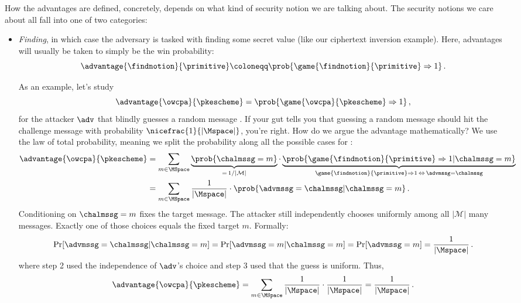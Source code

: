         How the advantages are defined, concretely, depends on what kind of security
          notion we are talking about.
          The security notions we care about all fall into one of two categories:
        
        \begin{itemize}
        	\item \emph{Finding},
        		in which case the adversary is tasked with finding some secret value
        		(like our ciphertext inversion example). Here, 
        		advantages will usually be taken to simply be the win probability:
        		\[
	        		\advantage{\findnotion}{\primitive} \coloneqq
	        		\prob{\game{\findnotion}{\primitive} \Rightarrow 1}\, .
        		\]
        		
        		As an example, let's study
        		\[
	        		\advantage{\owcpa}{\pkescheme} = \prob{\game{\owcpa}{\pkescheme} \Rightarrow 1} \, ,
        		\]
        		for the attacker $\adv$ that blindly guesses a random message \advmssg.
        		If your gut tells you that guessing a random message \advmssg should hit the challenge message \chalmssg
        		with probability $\nicefrac{1}{|\Mspace|}$, you're right.
        		How do we argue the advantage mathematically?
        		We use the law of total probability, meaning we split the probability along all the possible cases for \chalmssg:
        		\begin{align*}
        			\advantage{\owcpa}{\pkescheme}
        			&= \sum_{m\in \MSpace} \underbrace{
        										\prob{\chalmssg = m}
        									}_{=\,1/|\mathcal M|}
        			 			\cdot \underbrace{
        			 				\prob{ \game{\findnotion}{\primitive} \Rightarrow 1 | \chalmssg = m}
        		 					}_{\game{\findnotion}{\primitive} \Rightarrow 1 \,\Leftrightarrow \,\advmssg = \chalmssg}\\
        			&= \sum_{m\in \MSpace} \frac{1}{|\Mspace|} \cdot \prob{\advmssg = \chalmssg | \chalmssg = m} \, .
        		\end{align*}
        		Conditioning on $\chalmssg = m$ fixes the target message.
        		The attacker still independently chooses uniformly among all $|\mathcal M|$ many messages.
        		Exactly one of those choices equals the fixed target $m$.
        		Formally:
        		\[
	        		\Pr[\advmssg = \chalmssg | \chalmssg = m]
	        		= \Pr[\advmssg = m | \chalmssg = m]
	        		= \Pr[\advmssg = m]
	        		= \frac{1}{|\Mspace|} \, .
        		\]
        		where step 2 used the independence of $\adv$'s choice and step 3 used that the guess is uniform.
        		Thus,
        		\[
	        		\advantage{\owcpa}{\pkescheme} =
	        		\sum_{m\in \MSpace} \frac{1}{|\Mspace|} \cdot \frac{1}{|\Mspace|}
	        		= \frac{1}{|\Mspace|} \, .
        		\]
        		

\end{itemize}
